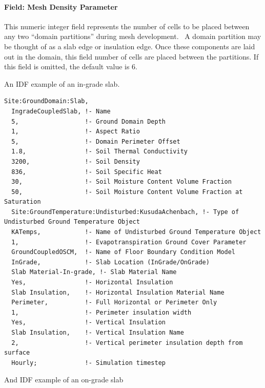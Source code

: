 \paragraph{Field: Mesh Density Parameter}

This numeric integer field represents the number of cells to be placed between any two ``domain partitions'' during mesh development.~ A domain partition may be thought of as a slab edge or insulation edge. Once these components are laid out in the domain, this field number of cells are placed between the partitions. If this field is omitted, the default value is 6.

An IDF example of an in-grade slab.

\begin{lstlisting}
Site:GroundDomain:Slab,
  IngradeCoupledSlab, !- Name
  5,                  !- Ground Domain Depth
  1,                  !- Aspect Ratio
  5,                  !- Domain Perimeter Offset
  1.8,                !- Soil Thermal Conductivity
  3200,               !- Soil Density
  836,                !- Soil Specific Heat
  30,                 !- Soil Moisture Content Volume Fraction
  50,                 !- Soil Moisture Content Volume Fraction at Saturation
  Site:GroundTemperature:Undisturbed:KusudaAchenbach, !- Type of Undisturbed Ground Temperature Object
  KATemps,            !- Name of Undisturbed Ground Temperature Object
  1,                  !- Evapotranspiration Ground Cover Parameter
  GroundCoupledOSCM,  !- Name of Floor Boundary Condition Model
  InGrade,            !- Slab Location (InGrade/OnGrade)
  Slab Material-In-grade, !- Slab Material Name
  Yes,                !- Horizontal Insulation
  Slab Insulation,    !- Horizontal Insulation Material Name
  Perimeter,          !- Full Horizontal or Perimeter Only
  1,                  !- Perimeter insulation width
  Yes,                !- Vertical Insulation
  Slab Insulation,    !- Vertical Insulation Name
  2,                  !- Vertical perimeter insulation depth from surface
  Hourly;             !- Simulation timestep
\end{lstlisting}

And IDF example of an on-grade slab

